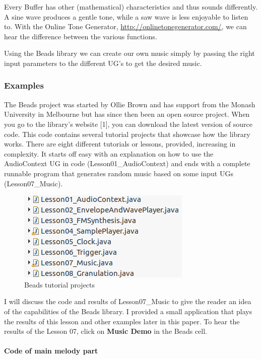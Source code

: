 \documentclass[12pt]{article}
\begin{document}
Every Buffer has other (mathematical) characteristics and thus sounds differently. A sine wave produces a gentle tone, while a saw wave is less enjoyable to listen to. With the Online Tone Generator, \url{http://onlinetonegenerator.com/}, we can hear the difference between the various functions.
\newline

Using the Beads library we can create our own music simply by passing the right input parameters to the different UG's to get the desired music.

\subsubsection{Examples}

The Beads project was started by Ollie Brown and has support from the Monash University in Melbourne but has since then been an open source project. When you go to the library's website [1], you can download the latest version of source code. This code contains several tutorial projects that showcase how the library works. There are eight different tutorials or lessons,  provided, increasing in complexity. It starts off easy with an explanation on how to use the AudioContext UG in code (Lesson01\_AudioContext) and ends with a complete runnable program that generates random music based on some input UGs (Lesson07\_Music).

\begin{figure}[h]
\centering
\includegraphics[scale=0.67]{img/beads_tut}
\caption{Beads tutorial projects}
\end{figure}

I will discuss the code and results of Lesson07\_Music to give the reader an idea of the capabilities of the Beads library. I provided a small application that plays the results of this lesson and other examples later in this paper. To hear the results of the Lesson 07, click on \textbf{Music Demo} in the Beads cell.

\paragraph{Code of main melody part}
\end{document}
